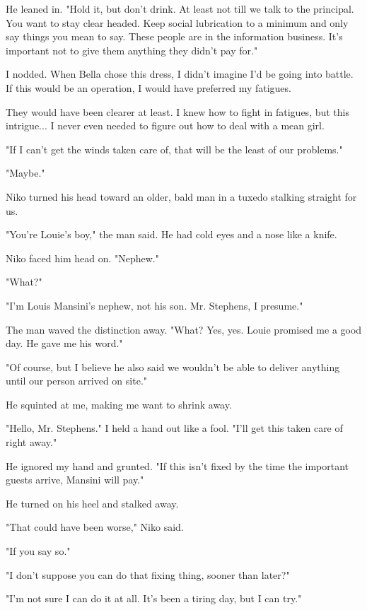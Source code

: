 \documentclass{novel}
\begin{document}
He leaned in. "Hold it, but don't drink.  At least not till we talk to the principal. You want to stay clear headed. Keep social lubrication to a minimum and only say things you mean to say.  These people are in the information business.  It's important not to give them anything they didn't pay for."

I nodded.  When Bella chose this dress, I didn't imagine I'd be going into battle.  If this would be an operation, I would have preferred my fatigues.

They would have been clearer at least.  I knew how to fight in fatigues, but this intrigue... I never even needed to figure out how to deal with a mean girl. 

"If I can't get the winds taken care of, that will be the least of our problems."

"Maybe."

Niko turned his head toward an older, bald man in a tuxedo stalking straight for us.  

"You're Louie's boy,"  the man said.  He had cold eyes and a nose like a knife.  

Niko faced him head on.  "Nephew."

"What?"

"I'm Louis Mansini's nephew, not his son.  Mr. Stephens, I presume."

The man waved the distinction away.  "What?  Yes, yes.  Louie promised me a good day.  He gave me his word."

"Of course, but I believe he also said we wouldn't be able to deliver anything until our person arrived on site."

He squinted at me, making me want to shrink away.

"Hello, Mr. Stephens."  I held a hand out like a fool.  "I'll get this taken care of right away."

He ignored my hand and grunted.  "If this isn't fixed by the time the important guests arrive, Mansini will pay."

He turned on his heel and stalked away.  

"That could have been worse," Niko said.  

"If you say so."

"I don't suppose you can do that fixing thing, sooner than later?"

"I'm not sure I can do it at all.  It's been a tiring day, but I can try."


\clearpage
\begin{ChapterStart}
\vspace{2\nbs}

\end{ChapterStart}
\end{document}
